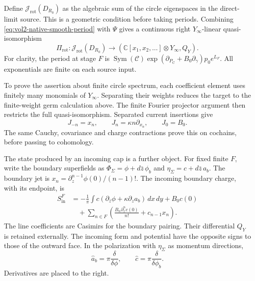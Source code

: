Define \(\mathcal J_{\mathrm{rot}}(D_{R_0})\) as the algebraic sum of
the circle eigenspaces in the direct-limit source. This is a geometric
condition before taking periods. Combining
\eqref{eq:vol2-native-smooth-period} with \(\Psi\) gives a continuous
right \(Y_\infty\)-linear quasi-isomorphism
\begin{equation}\label{eq:vol2-native-regular-period}
 \Pi_{\mathrm{rot}}:\mathcal J_{\mathrm{rot}}(D_{R_0})
       \longrightarrow
       (\mathbb C[x_1,x_2,\ldots]\otimes Y_\infty,Q_Y).
\end{equation}
For clarity, the period at stage \(F\) is
\(\operatorname{Sym}(\mathcal C)
\exp(\partial_{P_{\mathrm C}}+B_0\partial_\gamma)p_0e^{L_F}\).
All exponentials are finite on each source input.

To prove the assertion about finite circle spectrum, each coefficient
element uses finitely many monomials of \(Y_\infty\).
Separating their weights reduces the target to the finite-weight germ
calculation above. The finite Fourier projector argument then restricts
the full quasi-isomorphism. Separated current insertions give
\[
 J_{-n}=x_n,\qquad J_n=\kappa n\partial_{x_n},\qquad J_0=B_0.
\]
The same Cauchy, covariance and charge contractions prove this on
cochains, before passing to cohomology.

The state produced by an incoming cap is a further object.
For fixed finite \(F\), write the boundary superfields as
\(\Phi_\Sigma=\phi+d\bar z\,\phi_b\) and
\(\eta_\Sigma=c+d\bar z\,a_b\). The boundary jet is
\(x_n=\partial_z^{n-1}\phi(0)/(n-1)!\).
The incoming boundary charge, with its endpoint, is
\begin{equation}\label{eq:vol2-native-incoming-charge}
 \begin{split}
 S^F_{\mathrm{in}}
 &=-\frac1\pi\int c(\partial_{\bar z}\phi+\kappa\partial_z a_b)\,dx\,dy
       +B_0c(0)\\
 &\quad+\sum_{n\in F}
       \left(\frac{B_n\partial_z^nc(0)}{n!}+c_{n-1}x_n\right).
 \end{split}
\end{equation}
The line coefficients are Casimirs for the boundary pairing. Their
differential \(Q_Y\) is retained externally. The incoming form and
potential have the opposite signs to those of the outward face.
In the polarization with \(\eta_\Sigma\) as momentum directions,
\[
             \widehat a_b=\pi\frac\delta{\delta\phi},
             \qquad \widehat c=\pi\frac\delta{\delta\phi_b}.
\]
Derivatives are placed to the right.

